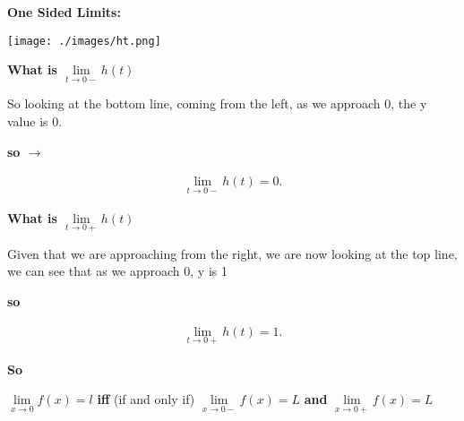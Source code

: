 \documentclass{report}
\begin{document}
    \pagebreak
    \begin{large}
        \noindent \textbf{One Sided Limits:}
    \end{large}
   
    
    \bigbreak \noindent 
    \begin{center}
        \texttt{[image: ./images/ht.png]} 
    \end{center}

    \bigbreak \noindent \bigbreak \noindent 
    \bigbreak \noindent 
    \textbf{What is $\lim\limits_{t \to 0- }{h \left(t\right)}$}

    \bigbreak \noindent 
    So looking at the bottom line, coming from the left, as we approach 0, the y value is 
    0.

    \bigbreak \noindent 
    \textbf{so $\rightarrow$}

    \begin{align*}
        \lim\limits_{t \to 0- }{h \left(t\right) = 0}
    .\end{align*}


    \bigbreak \noindent 
    \textbf{What is $\lim\limits_{t \to 0+}{h \left(t\right)}$} 

    \bigbreak \noindent 
    Given that we are approaching from the right, we are now looking at the top line, 
    we can see that as we approach 0, y is 1

    \bigbreak \noindent 
    \textbf{so}

    \begin{align*}
        \lim\limits_{t \to 0+ }{h \left(t\right) = 1}
    .\end{align*}

    \bigbreak \noindent 

    \bigbreak \noindent 
    \textbf{So}

    \bigbreak \noindent 
    $\lim\limits_{x \to 0}{f \left(x\right) = l}$ \textbf{iff} (if and only if) $\lim\limits_{x \to 0- }{f \left(x\right) = L}$ \textbf{and} $\lim\limits_{x \to 0+ }{f \left(x\right) = L}$
\end{document}
